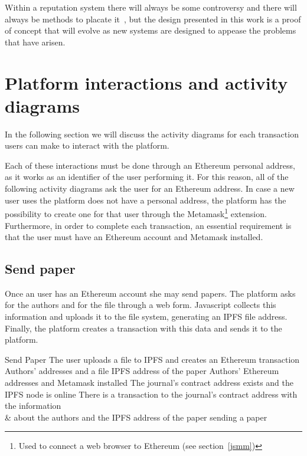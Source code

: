 Within a reputation system there will always be some controversy and there will
always be methods to placate it~\cite{dellarocas2000immunizing}, but the design
presented in this work is a proof of concept that will evolve as new systems are
designed to appease the problems that have arisen.


\section{Platform interactions and activity diagrams}
\label{sec:funct-requ-activ}

In the following section we will discuss the
activity diagrams for each transaction users can make to interact with the
platform.

Each of these interactions must be done through an Ethereum personal address, as
it works as an identifier of the user performing it. For this reason, all of the
following activity diagrams ask the user for an Ethereum address. In case a new
user uses the platform does not have a personal address, the platform has the
possibility to create one for that user through the Metamask\footnote{Used to
  connect a web browser to Ethereum (see section~\ref{jsmm})} extension.
Furthermore, in order to complete each transaction, an essential requirement is
that the user must have an Ethereum account and Metamask installed.

\subsection*{Send paper}

Once an user has an Ethereum account she may send papers. The platform asks for
the authors and for the file through a web form. Javascript collects this
information and uploads it to the file system, generating an IPFS file address.
Finally, the platform creates a transaction with this data and sends it to the
platform.

{Send Paper}%
{The user uploads a file to IPFS and creates an Ethereum
  transaction}%
{Authors' addresses and a file}%
{IPFS address of the paper}%
{Authors' Ethereum addresses and Metamask installed}%
{The journal's contract address exists and the IPFS node is
  online}%
{There is a transaction to the journal's contract address with the information\\
  & about the authors and the IPFS address of the paper }%
{sending a paper}%

